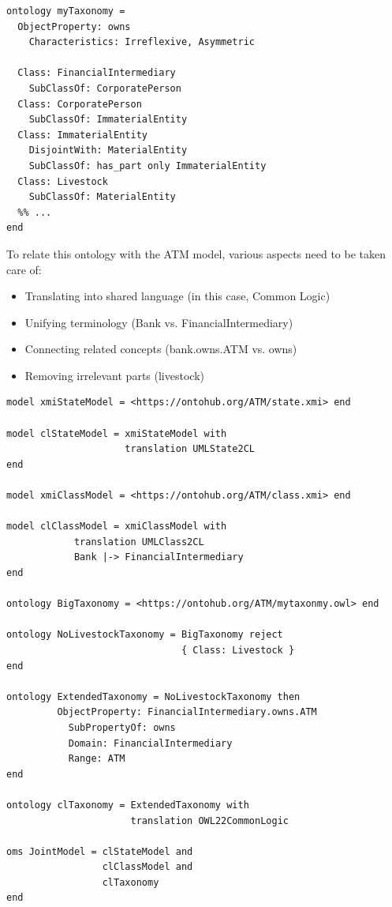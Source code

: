 \documentclass[10pt, a4paper]{isov2}
\begin{document}
\begin{lstlisting}[basicstyle=\ttfamily,language=dolText,alsolanguage=owl2Manchester,escapechar=@,mathescape]
ontology myTaxonomy =
  ObjectProperty: owns
    Characteristics: Irreflexive, Asymmetric

  Class: FinancialIntermediary
    SubClassOf: CorporatePerson
  Class: CorporatePerson
    SubClassOf: ImmaterialEntity
  Class: ImmaterialEntity
    DisjointWith: MaterialEntity
    SubClassOf: has_part only ImmaterialEntity
  Class: Livestock
    SubClassOf: MaterialEntity
  %% ...
end
\end{lstlisting}

 To relate this ontology with the ATM model, 
various aspects need to be taken care of:
\begin{itemize}
  \item Translating into shared language  (in this case, Common Logic)
  \item Unifying terminology (Bank vs. FinancialIntermediary)
  \item Connecting related concepts (bank.owns.ATM vs. owns)
  \item Removing irrelevant parts (livestock) 
\end{itemize}

\begin{lstlisting}[basicstyle=\ttfamily\small,language=dolText,alsolanguage=owl2Manchester,escapechar=@,mathescape]
model xmiStateModel = <https://ontohub.org/ATM/state.xmi> end

model clStateModel = xmiStateModel with
                     translation UMLState2CL
end

model xmiClassModel = <https://ontohub.org/ATM/class.xmi> end

model clClassModel = xmiClassModel with
            translation UMLClass2CL
            Bank |-> FinancialIntermediary
end

ontology BigTaxonomy = <https://ontohub.org/ATM/mytaxonmy.owl> end

ontology NoLivestockTaxonomy = BigTaxonomy reject
                               { Class: Livestock }
end

ontology ExtendedTaxonomy = NoLivestockTaxonomy then
         ObjectProperty: FinancialIntermediary.owns.ATM
           SubPropertyOf: owns
           Domain: FinancialIntermediary
           Range: ATM
end

ontology clTaxonomy = ExtendedTaxonomy with
                      translation OWL22CommonLogic

oms JointModel = clStateModel and
                 clClassModel and
                 clTaxonomy
end
\end{lstlisting}
\end{document}
